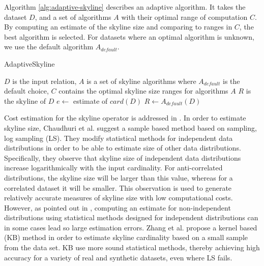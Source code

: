 \documentclass[12pt,a4paper,twoside]{report}
\begin{document}
Algorithm \ref{alg:adaptive-skyline} describes an adaptive algorithm.
It takes the dataset $D$, and a set of algorithms $A$ with their
optimal range of computation $C$. By computing an estimate of the
skyline size and comparing to ranges in $C$, the best algorithm is
selected. For datasets where an optimal algorithm is unknown, we use
the default algorithm $A_{default}$.

\begin{algorithm}[H]
	\caption{AdaptiveSkyline}
	\label{alg:adaptive-skyline}
	\begin{algorithmic}
		\Require $D$ is the input relation,
		$A$ is a set of skyline algorithms where $A_{default}$ is the default choice,
		$C$ contains the optimal skyline size ranges for algorithms $A$
		\Ensure $R$ is the skyline of $D$
		\State$e \leftarrow$ estimate of $card(D)$
				\State \Return
			\EndIf
		\EndFor
		\State $R \leftarrow A_{default}(D)$
   \end{algorithmic}
\end{algorithm}

Cost estimation for the skyline operator is addressed in
\cite{zhang2009kernel,chaudhuri2006robust,godfrey2004skyline}.  In
order to estimate skyline size, Chaudhuri et al. suggest a sample
based method based on sampling, log sampling (LS). They modify
statistical methods for independent data distributions in order to be
able to estimate size of other data distributions. Specifically, they
observe that skyline size of independent data distributions increase
logarithmically with the input cardinality. For anti-correlated
distributions, the skyline size will be larger than this value,
whereas for a correlated dataset it will be smaller. This observation
is used to generate relatively accurate measures of skyline size with
low computational costs. However, as pointed out in
\cite{zhang2009kernel}, computing an estimate for non-independent
distributions using statistical methods designed for independent
distributions can in some cases lead so large estimation errors. Zhang
et al. propose a kernel based (KB) method in order to estimate skyline
cardinality based on a small sample from the data set. KB use more
sound statistical methods, thereby achieving high accuracy for a
variety of real and synthetic datasets, even where LS fails.
\end{document}
